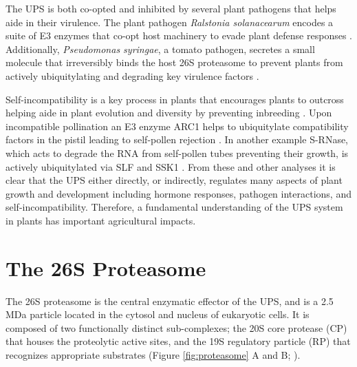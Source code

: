 	The UPS is both co-opted and inhibited by several plant pathogens that helps aide in their virulence. The plant pathogen \textit{Ralstonia solanacearum} encodes a suite of E3 enzymes that co-opt host machinery to evade plant defense responses \citep{angot06}. Additionally, \textit{Pseudomonas syringae}, a tomato pathogen, secretes a small molecule that irreversibly binds the host 26S proteasome to prevent plants from actively ubiquitylating and degrading key virulence factors \citep{schellenberg10}. 

	Self-incompatibility is a key process in plants that encourages plants to outcross helping aide in plant evolution and diversity by preventing inbreeding \citep{zhang09}. Upon incompatible pollination an E3 enzyme ARC1 helps to ubiquitylate compatibility factors in the pistil leading to self-pollen rejection \citep{stone03}. In another example S-RNase, which acts to degrade the RNA from self-pollen tubes preventing their growth, is actively ubiquitylated via SLF and SSK1 \citep{mcclure04, zhao10}. From these and other analyses it is clear that the UPS either directly, or indirectly, regulates many aspects of plant growth and development including hormone responses, pathogen interactions, and self-incompatibility. Therefore, a fundamental understanding of the UPS system in plants has important agricultural impacts.     

\section{The 26S Proteasome}
	The 26S proteasome is the central enzymatic effector of the UPS, and is a 2.5 MDa particle located in the cytosol and nucleus of eukaryotic cells.  It is composed of two functionally distinct sub-complexes; the 20S core protease (CP) that houses the proteolytic active sites, and the 19S regulatory particle (RP) that recognizes appropriate substrates (Figure \ref{fig:proteasome} A and B; \citep{bhattacharyya14, finley09, lander12, lasker12, unverdorben14}).

